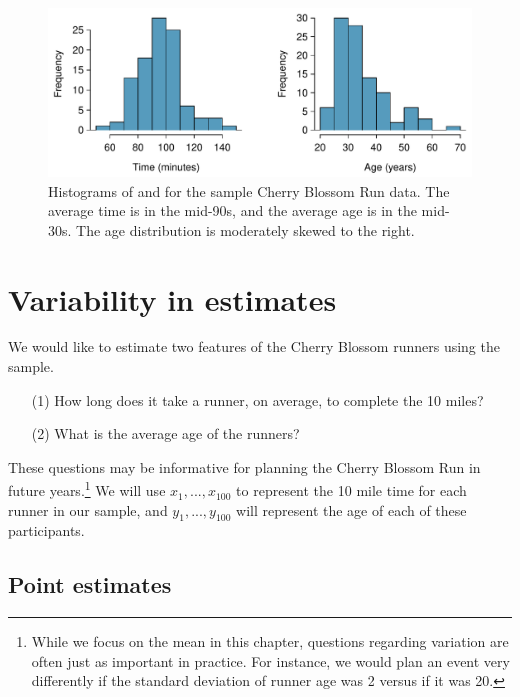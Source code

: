 \begin{figure}
\centering
\includegraphics[width=\textwidth]{04/figures/run10SampHistograms/run10SampHistograms} 
\caption{Histograms of  and  for the sample Cherry Blossom Run data. The average time is in the mid-90s, and the average age is in the mid-30s. The age distribution is moderately skewed to the right.}
\label{run10SampHistograms}
\end{figure}


\section{Variability in estimates}
\label{variabilityInEstimates}


We would like to estimate two features of the Cherry Blossom runners using the sample. 
\begin{itemize}
\setlength{\itemsep}{0mm}
\item[(1)] How long does it take a runner, on average, to complete the 10 miles?
\item[(2)] What is the average age of the runners?
\end{itemize}
These questions may be informative for planning the Cherry Blossom Run in future years.\footnote{While we focus on the mean in this chapter, questions regarding variation are often just as important in practice. For instance, we would plan an event very differently if the standard deviation of runner age was 2 versus if it was 20.} We will use $x_1, ..., x_{100}$ to represent the 10 mile time for each runner in our sample, and $y_1, ..., y_{100}$ will represent the age of each of these participants.

\subsection{Point estimates}
\label{pointEstimates}

